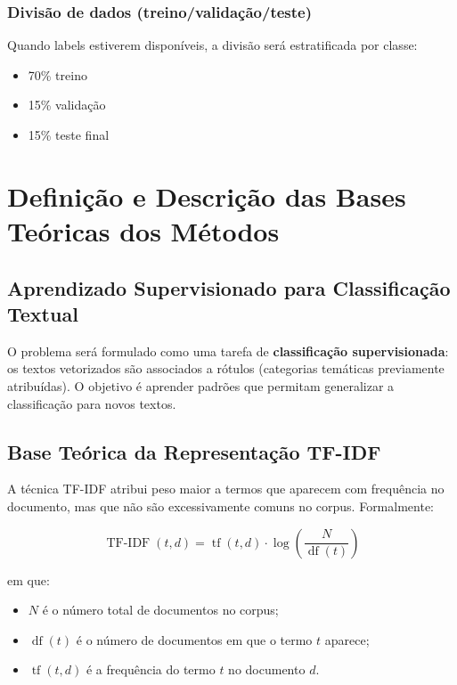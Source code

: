 \subsubsection{Divisão de dados (treino/validação/teste)}

Quando labels estiverem disponíveis, a divisão será estratificada por classe:

\begin{itemize}[leftmargin=1.2cm]
    \item 70\% treino
    \item 15\% validação
    \item 15\% teste final
\end{itemize}

\clearpage
\section{Definição e Descrição das Bases Teóricas dos Métodos}

\subsection{Aprendizado Supervisionado para Classificação Textual}

O problema será formulado como uma tarefa de \textbf{classificação supervisionada}: os textos vetorizados são associados a rótulos (categorias temáticas previamente atribuídas). O objetivo é aprender padrões que permitam generalizar a classificação para novos textos.

\subsection{Base Teórica da Representação TF-IDF}

A técnica TF-IDF atribui peso maior a termos que aparecem com frequência no documento, mas que não são excessivamente comuns no corpus. Formalmente:

\[
\operatorname{TF\mbox{-}IDF}(t,d) = \operatorname{tf}(t,d)\cdot \log\left(\frac{N}{\operatorname{df}(t)}\right)
\]

em que:
\begin{itemize}[leftmargin=1.2cm]
    \item $N$ é o número total de documentos no corpus;
    \item $\operatorname{df}(t)$ é o número de documentos em que o termo $t$ aparece;
    \item $\operatorname{tf}(t,d)$ é a frequência do termo $t$ no documento $d$.
\end{itemize}

